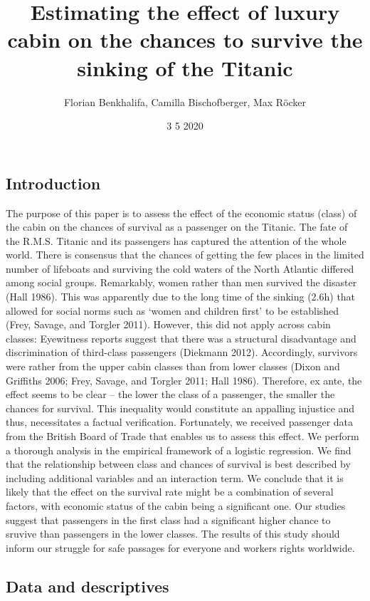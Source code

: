 \documentclass[
]{article}
\title{Estimating the effect of luxury cabin on the chances to survive the
sinking of the Titanic}
\author{Florian Benkhalifa, Camilla Bischofberger, Max Röcker}
\date{3 5 2020}
\begin{document}
\maketitle

\hypertarget{introduction}{%
\subsection{Introduction}\label{introduction}}

The purpose of this paper is to assess the effect of the economic status
(class) of the cabin on the chances of survival as a passenger on the
Titanic. The fate of the R.M.S. Titanic and its passengers has captured
the attention of the whole world. There is consensus that the chances of
getting the few places in the limited number of lifeboats and surviving
the cold waters of the North Atlantic differed among social groups.
Remarkably, women rather than men survived the disaster (Hall 1986).
This was apparently due to the long time of the sinking (2.6h) that
allowed for social norms such as `women and children first' to be
established (Frey, Savage, and Torgler 2011). However, this did not
apply across cabin classes: Eyewitness reports suggest that there was a
structural disadvantage and discrimination of third-class passengers
(Diekmann 2012). Accordingly, survivors were rather from the upper cabin
classes than from lower classes (Dixon and Griffiths 2006; Frey, Savage,
and Torgler 2011; Hall 1986). Therefore, ex ante, the effect seems to be
clear -- the lower the class of a passenger, the smaller the chances for
survival. This inequality would constitute an appalling injustice and
thus, necessitates a factual verification. Fortunately, we received
passenger data from the British Board of Trade that enables us to assess
this effect. We perform a thorough analysis in the empirical framework
of a logistic regression. We find that the relationship between class
and chances of survival is best described by including additional
variables and an interaction term. We conclude that it is likely that
the effect on the survival rate might be a combination of several
factors, with economic status of the cabin being a significant one. Our
studies suggest that passengers in the first class had a significant
higher chance to sruvive than passengers in the lower classes. The
results of this study should inform our struggle for safe passages for
everyone and workers rights worldwide.

\hypertarget{data-and-descriptives}{%
\subsection{Data and descriptives}\label{data-and-descriptives}}
\end{document}
